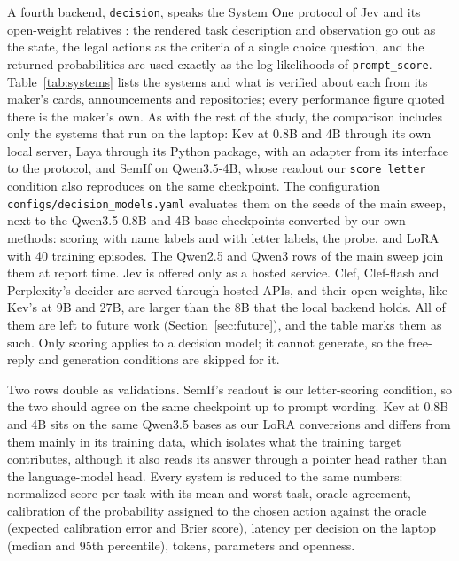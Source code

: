 A fourth backend, \texttt{decision}, speaks the System One protocol of Jev and its open-weight relatives \citep{typesafe2026choice,palmer2026kev,cloudflare2026clef}: the rendered task description and observation go out as the state, the legal actions as the criteria of a single choice question, and the returned probabilities are used exactly as the log-likelihoods of \texttt{prompt\_score}. Table~\ref{tab:systems} lists the systems and what is verified about each from its maker's cards, announcements and repositories; every performance figure quoted there is the maker's own. As with the rest of the study, the comparison includes only the systems that run on the laptop: Kev at 0.8B and 4B through its own local server, Laya through its Python package, with an adapter from its interface to the protocol, and SemIf on Qwen3.5-4B, whose readout our \texttt{score\_letter} condition also reproduces on the same checkpoint. The configuration \texttt{configs/decision\_models.yaml} evaluates them on the seeds of the main sweep, next to the Qwen3.5 0.8B and 4B base checkpoints converted by our own methods: scoring with name labels and with letter labels, the probe, and LoRA with 40 training episodes. The Qwen2.5 and Qwen3 rows of the main sweep join them at report time. Jev is offered only as a hosted service. Clef, Clef-flash and Perplexity's decider are served through hosted APIs, and their open weights, like Kev's at 9B and 27B, are larger than the 8B that the local backend holds. All of them are left to future work (Section~\ref{sec:future}), and the table marks them as such. Only scoring applies to a decision model; it cannot generate, so the free-reply and generation conditions are skipped for it.

Two rows double as validations. SemIf's readout is our letter-scoring condition, so the two should agree on the same checkpoint up to prompt wording. Kev at 0.8B and 4B sits on the same Qwen3.5 bases as our LoRA conversions and differs from them mainly in its training data, which isolates what the training target contributes, although it also reads its answer through a pointer head rather than the language-model head. Every system is reduced to the same numbers: normalized score per task with its mean and worst task, oracle agreement, calibration of the probability assigned to the chosen action against the oracle (expected calibration error and Brier score), latency per decision on the laptop (median and 95th percentile), tokens, parameters and openness.

